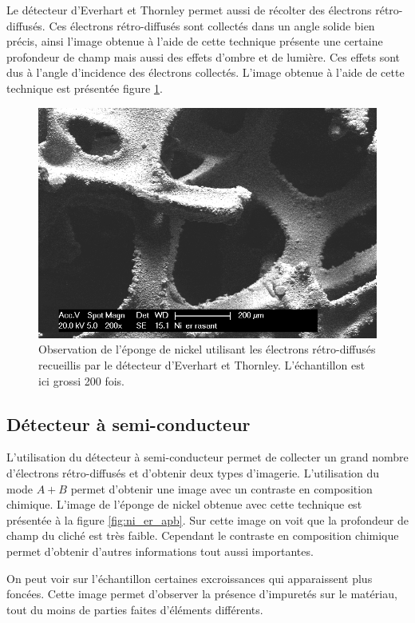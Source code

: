 \documentclass[a4paper,12pt]{article}
\newcommand\ett{Everhart et Thornley\xspace}
\begin{document}
Le détecteur d'\ett permet aussi de récolter des électrons rétro-diffusés. Ces électrons rétro-diffusés sont
collectés dans un angle solide bien précis, ainsi l'image obtenue à l'aide de cette technique présente une
certaine profondeur de champ mais aussi des effets d'ombre et de lumière. Ces effets sont dus à l'angle
d'incidence des électrons collectés. L'image obtenue à l'aide de cette technique est présentée figure
\ref{fig:ni_er_rasant}.

\begin{figure}
\centering
\includegraphics[width = 0.7 \textwidth]{images/ni_er_rasant.png}
\caption{Observation de l'éponge de nickel utilisant les électrons rétro-diffusés recueillis par le détecteur d'\ett. L'échantillon est ici grossi 200 fois.}
\label{fig:ni_er_rasant}
\end{figure}


\subsection{Détecteur à semi-conducteur}

L'utilisation du détecteur à semi-conducteur permet de collecter un grand nombre d'électrons rétro-diffusés
et d'obtenir deux types d'imagerie. L'utilisation du mode $A+B$ permet d'obtenir une image avec un contraste
en composition chimique. L'image de l'éponge de nickel obtenue avec cette technique est présentée à la figure
\ref{fig:ni_er_apb}. Sur cette image on voit que la profondeur de champ du cliché est très faible. Cependant
le contraste en composition chimique permet d'obtenir d'autres informations tout aussi importantes.

On peut voir sur l'échantillon certaines excroissances qui apparaissent plus foncées. Cette image permet d'observer
la présence d'impuretés sur le matériau, tout du moins de parties faites d'éléments différents.
\end{document}
